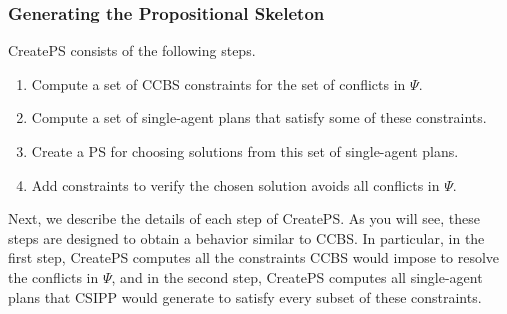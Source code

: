 \documentclass[review]{elsarticle}
\newcommand{\implicitct}{\textit{ImplicitCT}\xspace}
\newcommand{\decidet}{\ensuremath{\mathit{DECIDE_T}}\xspace}
\newcommand{\ccbs}{\ac{CCBS}\xspace}
\newcommand{\ct}{\ac{CT}\xspace}
\newcommand{\csipp}{\ac{CSIPP}\xspace}
\newcommand{\ps}{\ac{PS}\xspace}
\newcommand{\mapfr}{\ac{MAPF}$_R$\xspace}
\newcommand{\mapf}{\ac{MAPF}\xspace}
\begin{document}
\subsubsection{Generating the Propositional Skeleton}
\label{sec:propositional-skeleton}








\noindent CreatePS consists of the following steps. 
\begin{enumerate}
	\item Compute a set of \ccbs constraints for the set of conflicts in $\Psi$. 
	\item Compute a set of single-agent plans that satisfy some of these constraints.
	\item Create a \ps for choosing solutions from this set of single-agent plans. 
	\item Add constraints to verify the chosen solution avoids all conflicts in $\Psi$. 
\end{enumerate}
Next, we describe the details of each step of CreatePS. 
As you will see, these steps are designed to obtain a behavior similar to \ccbs. 
In particular, in the first step, CreatePS computes all the constraints \ccbs would impose to resolve the conflicts in $\Psi$, 
and in the second step, CreatePS computes all single-agent plans that \csipp would generate to satisfy every subset of these constraints. 
\end{document}
